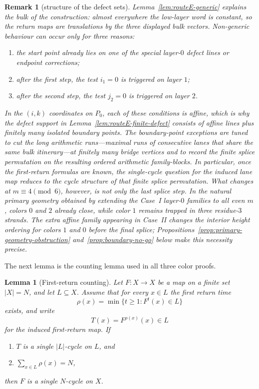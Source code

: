 \documentclass[11pt]{article}
\newtheorem{lemma}{Lemma}
\newtheorem{remark}{Remark}
\begin{document}
\begin{remark}[structure of the defect sets]\label{rem:routeE-design}
Lemma~\ref{lem:routeE-generic} explains the bulk of the construction: almost everywhere the low-layer word is constant, so the return maps are translations by the three displayed bulk vectors.
Non-generic behaviour can occur only for three reasons:
\begin{enumerate}[label=\textup{(\alph*)},leftmargin=2em]
\item the start point already lies on one of the special layer-$0$ defect lines or endpoint corrections;
\item after the first step, the test $i_1=0$ is triggered on layer $1$;
\item after the second step, the test $j_2=0$ is triggered on layer $2$.
\end{enumerate}
In the $(i,k)$ coordinates on $P_0$, each of these conditions is affine, which is why the defect support in Lemma~\ref{lem:routeE-finite-defect} consists of affine lines plus finitely many isolated boundary points.
The boundary-point exceptions are tuned to cut the long arithmetic runs---maximal runs of consecutive lanes that share the same bulk itinerary---at finitely many bridge vertices and to record the finite splice permutation on the resulting ordered arithmetic family-blocks.
In particular, once the first-return formulas are known, the single-cycle question for the induced lane map reduces to the cycle structure of that finite splice permutation.
What changes at $m\equiv 4\pmod{6}$, however, is not only the last splice step.
In the natural primary geometry obtained by extending the Case~I layer-$0$ families to all even $m$, colors $0$ and $2$ already close, while color $1$ remains trapped in three residue-$3$ strands.
The extra affine family appearing in Case~II changes the interior height ordering for colors $1$ and $0$ before the final splice; Propositions~\ref{prop:primary-geometry-obstruction} and~\ref{prop:boundary-no-go} below make this necessity precise.
\end{remark}

The next lemma is the counting lemma used in all three color proofs.

\begin{lemma}[First-return counting]\label{lem:counting}
Let $F:X\to X$ be a map on a finite set $|X|=N$, and let $L\subseteq X$.
Assume that for every $x\in L$ the first return time
\[
\rho(x)=\min\{t\ge 1:F^t(x)\in L\}
\]
exists, and write
\[
T(x)=F^{\rho(x)}(x)\in L
\]
for the induced first-return map.
If
\begin{enumerate}[label=\textup{(\roman*)}]
\item $T$ is a single $|L|$-cycle on $L$, and
\item $\sum_{x\in L}\rho(x)=N$,
\end{enumerate}
then $F$ is a single $N$-cycle on $X$.
\end{lemma}
\end{document}
